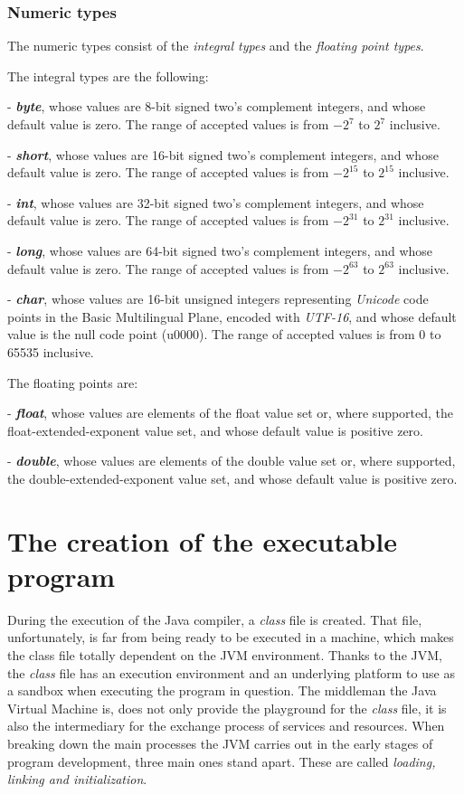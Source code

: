 \documentclass[english,runningheads,a4paper]{llncs}[2018/03/10]
\begin{document}
\subsubsection*{Numeric types}
The numeric types consist of the \textit{integral types} and the
\textit{floating point types}.

The integral types are the following:

    - \textit{\textbf{byte}}, whose values are 8-bit signed two's complement
    integers, and whose default value is zero. The range of accepted values is
    from \(-2^7\) to \(2^7\) inclusive.

    - \textit{\textbf{short}}, whose values are 16-bit signed two's complement
    integers, and whose default value is zero. The range of accepted values is
    from \(-2^{15}\) to \(2^{15}\) inclusive.

    - \textit{\textbf{int}}, whose values are 32-bit signed two's complement
    integers, and whose default value is zero. The range of accepted values is
    from \(-2^{31}\) to \(2^{31}\) inclusive.
    
    - \textit{\textbf{long}}, whose values are 64-bit signed two's complement
    integers, and whose default value is zero. The range of accepted values is
    from \(-2^{63}\) to \(2^{63}\) inclusive.

    - \textit{\textbf{char}}, whose values are 16-bit unsigned integers
    representing \textit{Unicode} code points in the Basic Multilingual Plane,
    encoded with \textit{UTF-16}, and whose default value is the null code point
    (u0000). The range of accepted values is from 0 to 65535 inclusive.

The floating points are:

    - \textbf{\textit{float}}, whose values are elements of the float value set or, where
    supported, the float-extended-exponent value set, and whose default value is
    positive zero.
    
    - \textbf{\textit{double}}, whose values are elements of the double value set or,
    where supported, the double-extended-exponent value set, and whose default
    value is positive zero.

\newpage
\section*{The creation of the executable program}
During the execution of the Java compiler, a \textit{class} file is created.
That file, unfortunately, is far from being ready to be executed in a machine,
which makes the class file totally dependent on the JVM environment. Thanks to
the JVM, the \textit{class} file has an execution environment and an underlying
platform to use as a sandbox when executing the program in question. The
middleman the Java Virtual Machine is, does not only provide the playground for
the \textit{class} file, it is also the intermediary for the exchange process of
services and resources. When breaking down the main processes the JVM carries
out in the early stages of program development, three main ones stand apart.
These are called \emph{loading, linking and initialization}.
\end{document}
